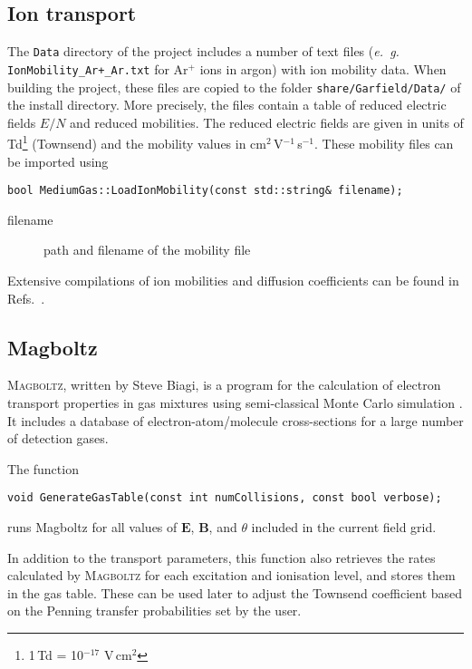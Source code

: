 \subsection{Ion transport}

The \texttt{Data} directory of the project includes a number of text files  
(\textit{e.~g.} \texttt{IonMobility\_Ar+\_Ar.txt} for Ar\(^{+}\) ions in argon) 
with ion mobility data. When building the project, these files are copied to the folder \texttt{share/Garfield/Data/} of the install directory. 
More precisely, the files contain
a table of reduced electric fields \(E/N\) and reduced mobilities.
The reduced electric fields are given in units of   
Td\footnote{1\,Td = 10\(^{-17}\) V\,cm\(^{2}\)} (Townsend) and the mobility values 
in cm\(^{2}\)\,V\(^{-1}\)\,s\(^{-1}\). 
These mobility files can be imported using
\begin{lstlisting}
bool MediumGas::LoadIonMobility(const std::string& filename);
\end{lstlisting}
\begin{description}
  \item[filename] path and filename of the mobility file
\end{description}
Extensive compilations of ion mobilities and diffusion coefficients 
can be found in Refs.~\cite{Ellis1976,Ellis1978,Ellis1984,Viehland1995}. 

\subsection{Magboltz}

\textsc{Magboltz}, written by Steve Biagi, is a program 
for the calculation of electron transport properties in gas 
mixtures using semi-classical Monte Carlo simulation
\cite{Biagi1999}. 
It includes a database of electron-atom/molecule cross-sections 
for a large number of detection gases. 

The function
\begin{lstlisting}
void GenerateGasTable(const int numCollisions, const bool verbose);
\end{lstlisting}
runs Magboltz for all values of \(\mathbf{E}\), \(\mathbf{B}\), 
and \(\theta\) included in the current field grid. 

In addition to the transport parameters, this function also 
retrieves the rates calculated by \textsc{Magboltz} for each excitation and 
ionisation level, and stores them in the gas table. These can be used 
later to adjust the Townsend coefficient based on the Penning transfer 
probabilities set by the user.

